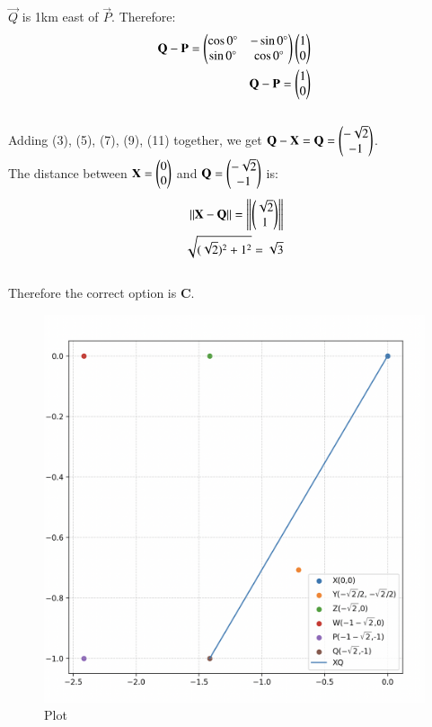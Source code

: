 \documentclass[12pt]{article}
\begin{document}
$\vec{Q}$ is 1km east of $\vec{P}$. Therefore:\begin{align}
\mathbf{Q}-\mathbf{P} = \begin{pmatrix}\cos0\degree & -\sin0\degree \\ \sin0\degree & \cos0\degree\end{pmatrix}\begin{pmatrix}1\\0\end{pmatrix}\\
\mathbf{Q}-\mathbf{P} = \begin{pmatrix}1\\0\end{pmatrix}
\end{align}\\
Adding (3), (5), (7), (9), (11) together, we get $\mathbf{Q}-\mathbf{X} =\mathbf{Q} = \begin{pmatrix}-\sqrt{2}\\-1\end{pmatrix}$.\\
The distance between $\mathbf{X}=\begin{pmatrix}0\\0\end{pmatrix}$ and $\mathbf{Q}=\begin{pmatrix}-\sqrt{2}\\-1\end{pmatrix}$ is:
\begin{align}
    ||\mathbf{X} - \mathbf{Q}||= \left\lVert\begin{pmatrix}\sqrt{2}\\1\end{pmatrix}\right\rVert \\
    \sqrt{(\sqrt{2})^2 +1^2} = \sqrt{3}
\end{align}\\
Therefore the correct option is \textbf{C}.


\begin{figure}[H]
    \centering
    \includegraphics[width=0.8\columnwidth]{Figs/1218.png}
    \caption{Plot}
    \label{fig:placeholder}
\end{figure}
\end{document}
